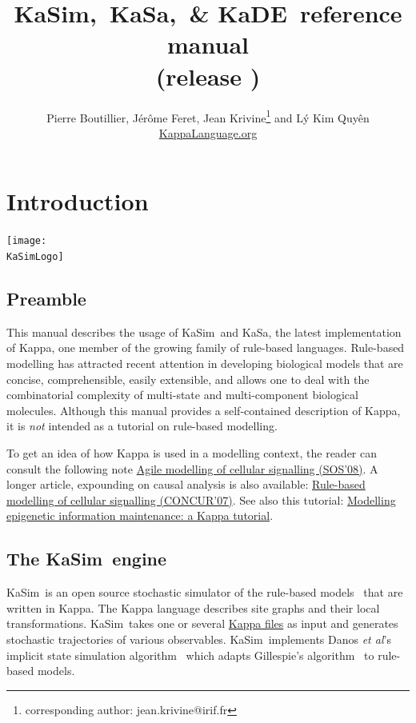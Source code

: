\documentclass[11pt]{book}
\title{KaSim,~KaSa,~\& KaDE~reference manual\\ \small (release \version)}
\author{Pierre Boutillier, J\'er\^ome Feret, Jean Krivine\thanks{corresponding author: jean.krivine@irif.fr} and L\'y Kim Quy\^en \\\href{http://www.kappalanguage.org}{KappaLanguage.org}}
\date{}
\def\KaSimLogo{img/KaSim-Logo.pdf}
\def\KaSim{\textsf{KaSim}}
\def\KaSa{\textsf{KaSa}}
\begin{document}
\maketitle


\tableofcontents
\listoftables

\chapter{Introduction}
\begin{center}\texttt{[image: \\KaSimLogo]}\end{center}

\section{Preamble}
This manual describes the usage of \KaSim~and \KaSa, the latest implementation of Kappa, one member of the growing family of rule-based languages. Rule-based modelling has attracted recent attention in developing biological models that are concise, comprehensible, easily extensible, and allows one to deal with the combinatorial complexity of multi-state and multi-component biological molecules.
Although this manual provides a self-contained description of Kappa, it is \emph{not} intended as a tutorial on rule-based modelling.
%


To get an idea of how Kappa is used in a modelling context, the reader can consult the following note \href{http://www.research.ed.ac.uk/portal/files/16869853/Agile_Modelling_of_Cellular_Signalling_Invited_Paper_.pdf}{Agile modelling of cellular signalling (SOS'08)}. A longer article, expounding on causal analysis is also available: \href{http://fontana.med.harvard.edu/www/Documents/WF/Papers/signaling.causality.pdf}{Rule-based modelling of cellular signalling (CONCUR'07)}. See also this tutorial: \href{https://hal.archives-ouvertes.fr/hal-00692430}{Modelling epigenetic information maintenance: a Kappa tutorial}.

\section{The \KaSim~engine}
\KaSim~is an open source stochastic simulator of the rule-based models~\cite{DanLan04,Dan_etal07a,Fae_etal05} that are written in Kappa. The Kappa language describes site graphs and their local transformations. \KaSim~takes one or several \hyperref[chap:kappa]{Kappa files} as input and generates stochastic trajectories of various observables. \KaSim~implements Danos \textit{et al}'s implicit state simulation algorithm~\cite{Dan_etal07b} which adapts Gillespie's algorithm~\cite{Gil76,Gil77} to rule-based models.
\end{document}
